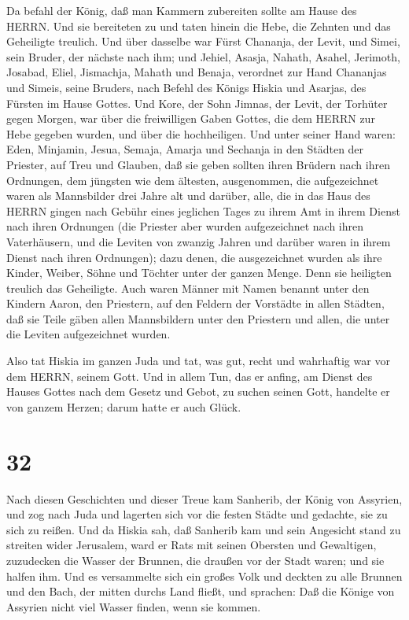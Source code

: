  Da befahl der König, daß man Kammern zubereiten sollte am
Hause des HERRN. Und sie bereiteten zu  und taten hinein
die Hebe, die Zehnten und das Geheiligte treulich. Und über dasselbe war
Fürst Chananja, der Levit, und Simei, sein Bruder, der nächste nach ihm;
 und Jehiel, Asasja, Nahath, Asahel, Jerimoth, Josabad,
Eliel, Jismachja, Mahath und Benaja, verordnet zur Hand Chananjas und
Simeis, seine Bruders, nach Befehl des Königs Hiskia und Asarjas, des
Fürsten im Hause Gottes.  Und Kore, der Sohn Jimnas, der
Levit, der Torhüter gegen Morgen, war über die freiwilligen Gaben
Gottes, die dem HERRN zur Hebe gegeben wurden, und über die
hochheiligen.  Und unter seiner Hand waren: Eden, Minjamin,
Jesua, Semaja, Amarja und Sechanja in den Städten der Priester, auf Treu
und Glauben, daß sie geben sollten ihren Brüdern nach ihren Ordnungen,
dem jüngsten wie dem ältesten,  ausgenommen, die
aufgezeichnet waren als Mannsbilder drei Jahre alt und darüber, alle,
die in das Haus des HERRN gingen nach Gebühr eines jeglichen Tages zu
ihrem Amt in ihrem Dienst nach ihren Ordnungen  (die
Priester aber wurden aufgezeichnet nach ihren Vaterhäusern, und die
Leviten von zwanzig Jahren und darüber waren in ihrem Dienst nach ihren
Ordnungen);  dazu denen, die ausgezeichnet wurden als ihre
Kinder, Weiber, Söhne und Töchter unter der ganzen Menge. Denn sie
heiligten treulich das Geheiligte.  Auch waren Männer mit
Namen benannt unter den Kindern Aaron, den Priestern, auf den Feldern
der Vorstädte in allen Städten, daß sie Teile gäben allen Mannsbildern
unter den Priestern und allen, die unter die Leviten aufgezeichnet
wurden.

 Also tat Hiskia im ganzen Juda und tat, was gut, recht und
wahrhaftig war vor dem HERRN, seinem Gott.  Und in allem
Tun, das er anfing, am Dienst des Hauses Gottes nach dem Gesetz und
Gebot, zu suchen seinen Gott, handelte er von ganzem Herzen; darum hatte
er auch Glück.

\hypertarget{section-31}{%
\section{32}\label{section-31}}

 Nach diesen Geschichten und dieser Treue kam Sanherib, der
König von Assyrien, und zog nach Juda und lagerten sich vor die festen
Städte und gedachte, sie zu sich zu reißen.  Und da Hiskia
sah, daß Sanherib kam und sein Angesicht stand zu streiten wider
Jerusalem,  ward er Rats mit seinen Obersten und Gewaltigen,
zuzudecken die Wasser der Brunnen, die draußen vor der Stadt waren; und
sie halfen ihm.  Und es versammelte sich ein großes Volk und
deckten zu alle Brunnen und den Bach, der mitten durchs Land fließt, und
sprachen: Daß die Könige von Assyrien nicht viel Wasser finden, wenn sie
kommen.

